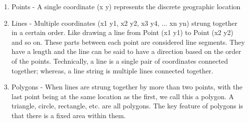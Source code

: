 \begin{enumerate}
\item Points - A single coordinate (x y) represents the discrete geographic
location
\item Lines - Multiple coordinates (x1 y1, x2 y2, x3 y4, ... xn yn) strung
together in a certain order. Like drawing a line from Point (x1 y1) to
Point (x2 y2) and so on. These parts between each point are considered line
segments. They have a length and the line can be said to have a direction
based on the order of the points. Technically, a line is a single pair of
coordinates connected together; whereas, a line string is multiple lines
connected together.  
\item Polygons - When lines are strung together by more
than two points, with the last point being at the same location as the
first, we call this a polygon. A triangle, circle, rectangle, etc. are all
polygons. The key feature of polygons is that there is a fixed area within them.  
\end{enumerate}

